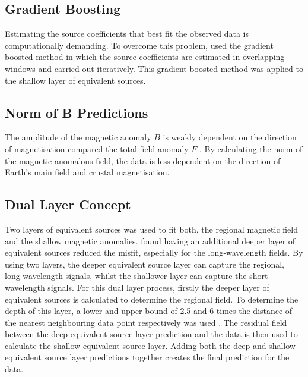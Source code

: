     
\subsection{Gradient Boosting}
Estimating the source coefficients that best fit the observed data is computationally demanding. To overcome this problem, \cite{SolerUieda2021} used the gradient boosted method in which the source coefficients are estimated in overlapping windows and carried out iteratively. This gradient boosted method was applied to the shallow layer of equivalent sources.

\subsection{Norm of B Predictions}
The amplitude of the magnetic anomaly $B$ is weakly dependent on the direction of magnetisation compared the total field anomaly $F$ \cite{HidalgoGato2021}. By calculating the norm of the magnetic anomalous field, the data is less dependent on the direction of Earth’s main field and crustal magnetisation.

\subsection{Dual Layer Concept}
Two layers of equivalent sources was used to fit both, the regional magnetic field and the shallow magnetic anomalies. \cite{Li2019} found having an additional deeper layer of equivalent sources reduced the misfit, especially for the long‐wavelength fields. By using two layers, the deeper equivalent source layer can capture the regional, long-wavelength signals, whilst the shallower layer can capture the short-wavelength signals. For this dual layer process, firstly the deeper layer of equivalent sources is calculated to determine the regional field. To determine the depth of this layer, a lower and upper bound of 2.5 and 6 times the distance of the nearest neighbouring data point respectively was used \cite{Dampney1969}. The residual field between the deep equivalent source layer prediction and the data is then used to calculate the shallow equivalent source layer. Adding both the deep and shallow equivalent source layer predictions together creates the final prediction for the data.

